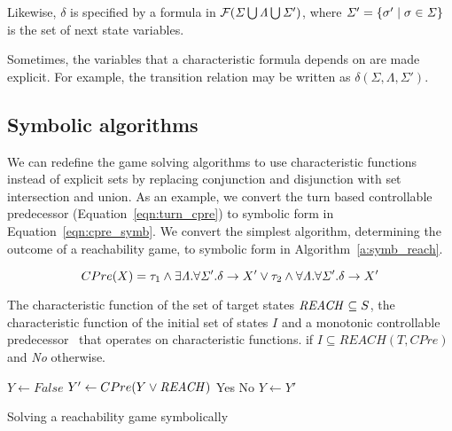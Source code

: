 Likewise, $\delta$ is specified by a formula in $\mathcal{F}(\mathit{\Sigma} \bigcup \mathit{\Lambda} \bigcup \mathit{\Sigma}')$, where $\mathit{\Sigma}' = \{\sigma' \mid \sigma \in \mathit{\Sigma} \}$ is the set of next state variables.

Sometimes, the variables that a characteristic formula depends on are made explicit. For example, the transition relation may be written as $\delta(\Sigma, \Lambda, \Sigma')$.

\subsection{Symbolic algorithms}
\label{sec:back_symbolic_alg}

We can redefine the game solving algorithms to use characteristic functions instead of explicit sets by replacing conjunction and disjunction with set intersection and union. As an example, we convert the turn based controllable predecessor (Equation~\ref{eqn:turn_cpre}) to symbolic form in Equation~\ref{eqn:cpre_symb}. We convert the simplest algorithm, determining the outcome of a reachability game, to symbolic form in Algorithm~\ref{a:symb_reach}.

\begin{equation}
CPre(X) = \tau_1 \wedge \exists \mathit{\Lambda}. \forall \mathit{\Sigma}'. \delta \rightarrow X' \vee \tau_2 \wedge \forall \mathit{\Lambda}. \forall \mathit{\Sigma}'. \delta \rightarrow X' 
\label{eqn:cpre_symb}
\end{equation}

\begin{algorithm}
\begin{algorithmic}

\Require The characteristic function of the set of target states $\mathit{REACH} \subseteq S$, the characteristic function of the initial set of states $I$ and a monotonic controllable predecessor \cpre\ that operates on characteristic functions.
 if $I \subseteq REACH(T, CPre)$ and {\it No} otherwise.

    \State $Y \gets False$
    \Loop
        \State $Y' \gets CPre(Y \vee \mathit{REACH})$
                \State\Return Yes
            \Else
                \State\Return No
            \EndIf
        \EndIf
        \State $Y \gets Y'$
    \EndLoop
\EndFunction

\end{algorithmic}
\caption{Solving a reachability game symbolically}
\label{a:symb_reach}
\end{algorithm}

